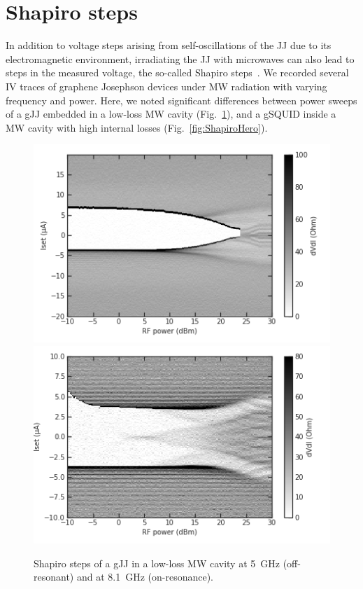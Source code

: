 \section{Shapiro steps}

In addition to voltage steps arising from self-oscillations of the JJ due to its electromagnetic environment, irradiating the JJ with microwaves can also lead to steps in the measured voltage, the so-called Shapiro steps~\cite{shapiroJosephsonCurrentsSuperconducting1963,kautzNoiseChaosJosephson1996,tinkhamIntroductionSuperconductivity1996,heerscheBipolarSupercurrentGraphene2007a,leeUltimatelyShortBallistic2015,shellyExistenceShapiroSteps2020,larsonZerobiasCrossingsPeculiar2020}.
%
We recorded several IV traces of graphene Josephson devices under MW radiation with varying frequency and power.
%
Here, we noted significant differences between power sweeps of a gJJ embedded in a low-loss MW cavity (Fig.~\ref{fig:Shapiro2x1}), and a gSQUID inside a MW cavity with high internal losses (Fig.~\ref{fig:ShapiroHero}).

\begin{figure}
	\centering
	\includegraphics[width=0.45\linewidth]{chapter-gJJ-misc/figs/processing_Shapiro_2x1_5GHz}
	\hfill
	\includegraphics[width=0.45\linewidth]{chapter-gJJ-misc/figs/processing_Shapiro_2x1_onres}
	\caption{Shapiro steps of a gJJ in a low-loss MW cavity at \SI{5}{\giga\hertz} (off-resonant) and at \SI{8.1}{\giga\hertz} (on-resonance).}
	\label{fig:Shapiro2x1}
\end{figure}


